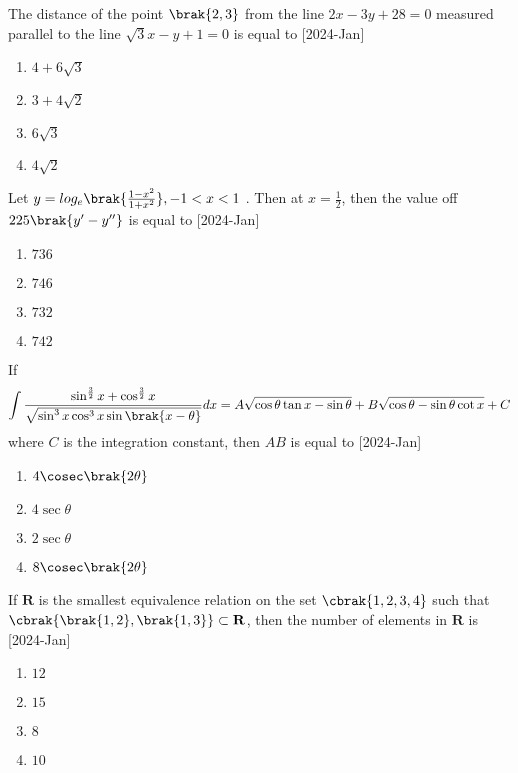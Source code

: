 \item The distance of the point $\brak{ 2 , 3 }$ from the line $2x - 3y + 28 =0 $ measured parallel to the line $\sqrt{3}x - y + 1 = 0$ is equal to \hfill[2024-Jan]
	\begin{multicols}{2}
		\begin{enumerate}
			\item $ 4 + 6\sqrt{3}$
			\item $ 3 + 4\sqrt{2}$
			\item $6\sqrt{3}$
			\item $4\sqrt{2}$
		\end{enumerate}
	\end{multicols}
\item Let $ y = log_e \brak{\frac{1 - x^2}{1 + x^2}} , -1 < x < 1$ . Then at $x = \frac{1}{2}$, then the value off $225\brak{y^\prime - y^{\prime\prime}}$ is equal to \hfill[2024-Jan]
	\begin{multicols}{2}
		\begin{enumerate}
			\item $736$
			\item $746$
			\item $732$
			\item $742$
		\end{enumerate}
	\end{multicols}
	\item If 
	\begin{align}
		\int \frac{ \sin^{\frac{3}{2}}x + \cos^{\frac{3}{2}}x}{\sqrt{ \sin^3x \cos^3 x \sin \brak{x - \theta}}} dx = A \sqrt{\cos\theta \tan x - \sin \theta} + B \sqrt{ \cos \theta - \sin \theta \cot x} + C 
	\end{align}
	where $C$ is the integration constant, then $AB$ is equal to \hfill[2024-Jan]
	\begin{multicols}{2}
		\begin{enumerate}
			\item $4 \cosec\brak{2\theta}$
			\item $4 \sec{\theta}$
			\item $2 \sec{\theta}$
			\item $8 \cosec\brak{2\theta}$
		\end{enumerate}
	\end{multicols}
\item If $\mathbf{R}$ is the smallest equivalence relation on the set $\cbrak{ 1,2 ,3 ,4}$ such that $\cbrak{\brak{1,2},\brak{1,3}} \subset \mathbf{R}$, then the number of elements in $\mathbf{R}$ is \hfill[2024-Jan]
	\begin{multicols}{2}
		\begin{enumerate}
			\item $12$
			\item $15$\\
			\item $8$
			\item $10$
		\end{enumerate}
	\end{multicols}
